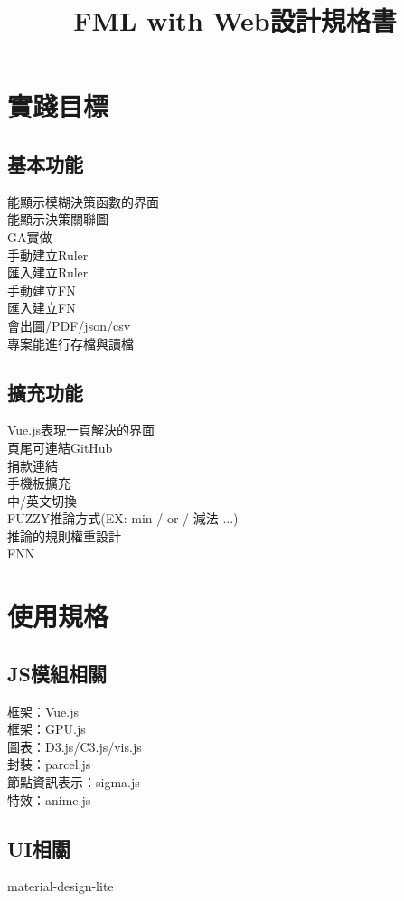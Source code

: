 \documentclass[UTF8]{article}
\title{FML with Web設計規格書}
\begin{document}
	
  \section{實踐目標}
		\subsection{基本功能}
			能顯示模糊決策函數的界面 \\
			能顯示決策關聯圖 \\
			GA實做 \\
			手動建立Ruler \\
			匯入建立Ruler \\
			手動建立FN \\
			匯入建立FN \\
			會出圖/PDF/json/csv \\
			專案能進行存檔與讀檔 \\

		\subsection{擴充功能}
			Vue.js表現一頁解決的界面 \\
			頁尾可連結GitHub \\
			捐款連結 \\
			手機板擴充 \\
			中/英文切換 \\
			FUZZY推論方式(EX: min / or / 減法 ...) \\
			推論的規則權重設計 \\
			FNN \\

  \section{使用規格}
		\subsection{JS模組相關}
		框架：Vue.js \\
		框架：GPU.js \\
		圖表：D3.js/C3.js/vis.js \\
		封裝：parcel.js \\
		節點資訊表示：sigma.js \\
		特效：anime.js

		\subsection{UI相關}
		material-design-lite \\
\end{document}
